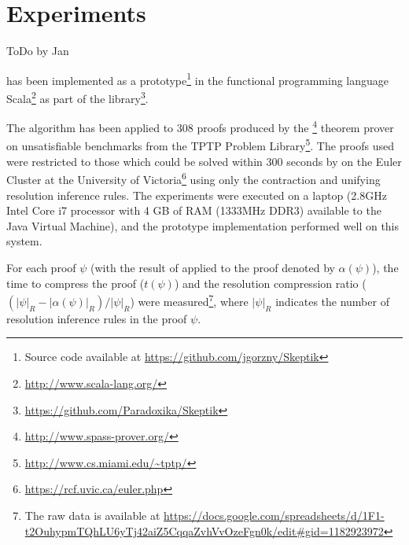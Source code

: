 
\section{Experiments} \label{sec:exp}

ToDo by Jan

{\SFOLowerUnits} has been implemented as a prototype\footnote{Source code available at \url{https://github.com/jgorzny/Skeptik}} in the functional programming language Scala\footnote{\url{http://www.scala-lang.org/}} as part of the \skeptik
 library\footnote{\url{https://github.com/Paradoxika/Skeptik}}. 

The algorithm has been applied to 308 proofs produced by the {\SPASS}\footnote{\url{http://www.spass-prover.org/}} theorem prover on unsatisfiable benchmarks from the TPTP Problem Library\footnote{\url{http://www.cs.miami.edu/~tptp/}}. The proofs used were restricted to those which could be solved within 300 seconds by {\SPASS} on the Euler Cluster at the University of Victoria\footnote{\url{https://rcf.uvic.ca/euler.php}} using only the contraction and unifying resolution inference rules. The experiments were executed on a laptop (2.8GHz Intel Core i7 processor with 4 GB of RAM (1333MHz DDR3) available to the Java Virtual Machine), and the prototype implementation performed well on this system.


For each proof $\psi$ (with the result of {\SFOLowerUnits} applied to the proof denoted by $\alpha(\psi)$), the time to compress the proof ($t(\psi)$) and the resolution compression ratio  ($(|\psi|_R-|\alpha(\psi)|_R)/|\psi|_R$) were measured\footnote{The raw data is available at \url{https://docs.google.com/spreadsheets/d/1F1-t2OuhypmTQhLU6yTj42aiZ5CqqaZvhVvOzeFgn0k/edit\#gid=1182923972}}, where $|\psi|_R$ indicates the number of resolution inference rules in the proof $\psi$.

